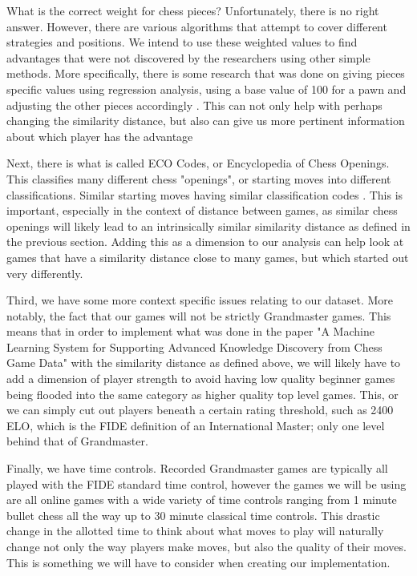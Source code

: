 \documentclass[12pt]{article}
\begin{document}
    What is the correct weight for chess pieces? Unfortunately, there is no right answer. However, there are various algorithms that attempt to cover different strategies and positions. We intend to use these weighted values to find advantages that were not discovered by the researchers using other simple methods. More specifically, there is some research that was done on giving pieces specific values using regression analysis, using a base value of 100 for a pawn and adjusting the other pieces accordingly \cite{piece_values}. This can not only help with perhaps changing the similarity distance, but also can give us more pertinent information about which player has the advantage

    Next, there is what is called ECO Codes, or Encyclopedia of Chess Openings. This classifies many different chess "openings", or starting moves into different classifications. Similar starting moves having similar classification codes \cite{eco}. This is important, especially in the context of distance between games, as similar chess openings will likely lead to an intrinsically similar similarity distance as defined in the previous section. Adding this as a dimension to our analysis can help look at games that have a similarity distance close to many games, but which started out very differently. 

    Third, we have some more context specific issues relating to our dataset. More notably, the fact that our games will not be strictly Grandmaster games. This means that in order to implement what was done in the paper "A Machine Learning System for Supporting Advanced Knowledge Discovery from Chess Game Data" with the similarity distance as defined above, we will likely have to add a dimension of player strength to avoid having low quality beginner games being flooded into the same category as higher quality top level games. This, or we can simply cut out players beneath a certain rating threshold, such as 2400 ELO, which is the FIDE definition of an International Master; only one level behind that of Grandmaster.

    Finally, we have time controls. Recorded Grandmaster games are typically all played with the FIDE standard time control, however the games we will be using are all online games with a wide variety of time controls ranging from 1 minute bullet chess all the way up to 30 minute classical time controls. This drastic change in the allotted time to think about what moves to play will naturally change not only the way players make moves, but also the quality of their moves. This is something we will have to consider when creating our implementation.
\end{document}
